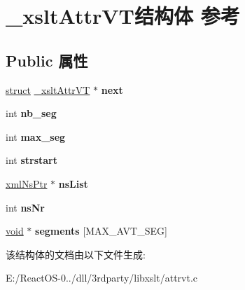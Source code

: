\hypertarget{struct__xslt_attr_v_t}{}\section{\+\_\+xslt\+Attr\+V\+T结构体 参考}
\label{struct__xslt_attr_v_t}
\subsection*{Public 属性}
\begin{DoxyCompactItemize}
\item 
\mbox{\label{struct__xslt_attr_v_t_a50055f3ef4b7f155115dae838eeb4518}} 
\hyperlink{interfacestruct}{struct} \hyperlink{struct__xslt_attr_v_t}{\+\_\+xslt\+Attr\+VT} $\ast$ {\bfseries next}
\item 
\mbox{\label{struct__xslt_attr_v_t_ae8519f2bf197e2fd4198251f7ff05782}} 
int {\bfseries nb\+\_\+seg}
\item 
\mbox{\label{struct__xslt_attr_v_t_a5bcd0773241f8515b853a4286913fa1d}} 
int {\bfseries max\+\_\+seg}
\item 
\mbox{\label{struct__xslt_attr_v_t_a3ef81349ec0eeccfa32f6c97d5a03a6e}} 
int {\bfseries strstart}
\item 
\mbox{\label{struct__xslt_attr_v_t_a60d70e71a9bf8aa3823b544e6be5f1af}} 
\hyperlink{struct__xml_ns}{xml\+Ns\+Ptr} $\ast$ {\bfseries ns\+List}
\item 
\mbox{\label{struct__xslt_attr_v_t_a81ef47e2cd2b551b1b9e7d9c1a7df070}} 
int {\bfseries ns\+Nr}
\item 
\mbox{\label{struct__xslt_attr_v_t_a3b27c7b6c3e88a675463026f7c1be779}} 
\hyperlink{interfacevoid}{void} $\ast$ {\bfseries segments} \mbox{[}M\+A\+X\+\_\+\+A\+V\+T\+\_\+\+S\+EG\mbox{]}
\end{DoxyCompactItemize}


该结构体的文档由以下文件生成\+:\begin{DoxyCompactItemize}
\item 
E\+:/\+React\+O\+S-\/0../dll/3rdparty/libxslt/attrvt.\+c\end{DoxyCompactItemize}
